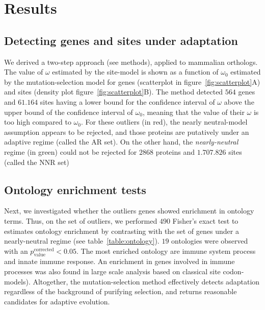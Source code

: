 \documentclass{article}
\begin{document}
\section*{Results}

\subsection*{Detecting genes and sites under adaptation}

We derived a two-step approach (see methods), applied to mammalian orthologs.
The value of $\omega$ estimated by the site-model is shown as a function of $\omega_{0}$ estimated by the mutation-selection model for genes (scatterplot in figure~\ref{fig:scatterplot}A) and sites (density plot figure~\ref{fig:scatterplot}B).
The method detected $564$ genes and $61.164$ sites having a lower bound for the confidence interval of $\omega$ above the upper bound of the confidence interval of $\omega_{0}$, meaning that the value of their $\omega$ is too high compared to $\omega_{0}$.
For these outliers (in red), the nearly neutral-model assumption appears to be rejected, and those proteins are putatively under an adaptive regime (called the AR set).
On the other hand, the \textit{nearly-neutral} regime (in green) could not be rejected for $2868$ proteins and $1.707.826$ sites (called the NNR set)

\subsection*{Ontology enrichment tests}
Next, we investigated whether the outliers genes showed enrichment in ontology terms.
Thus, on the set of outliers, we performed $490$ Fisher's exact test to estimates ontology enrichment by contrasting with the set of genes under a nearly-neutral regime (see table~\ref{table:ontology}).
$19$ ontologies were observed with an $p_{\text{value}}^{\text{corrected}} < 0.05$.
The most enriched ontology are immune system process and innate immune response.
An enrichment in genes involved in immune processes was also found in large scale analysis based on classical site codon-models\cite{kosiol_patterns_2008}).
Altogether, the mutation-selection method effectively detects adaptation regardless of the background of purifying selection, and returns reasonable candidates for adaptive evolution.
\end{document}
